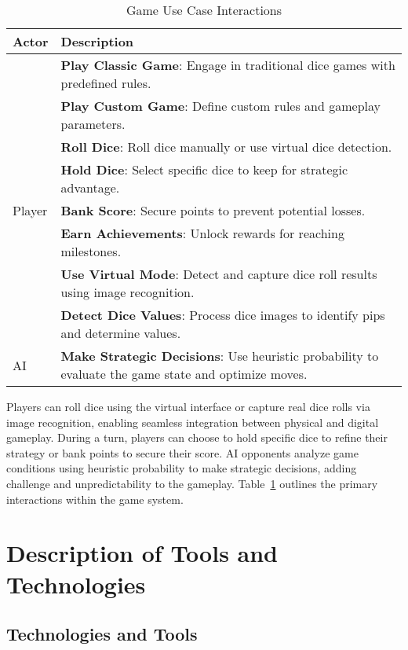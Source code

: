 \begin{table}[ht!]
    \centering
    \begin{tabular}{|l|p{12cm}|}
        \hline
        \textbf{Actor} & \textbf{Description} \\
        \hline
               & \textbf{Play Classic Game}: Engage in traditional dice games with predefined rules. \\
               & \textbf{Play Custom Game}: Define custom rules and gameplay parameters. \\
               & \textbf{Roll Dice}: Roll dice manually or use virtual dice detection. \\
               & \textbf{Hold Dice}: Select specific dice to keep for strategic advantage. \\
        Player & \textbf{Bank Score}: Secure points to prevent potential losses. \\
               & \textbf{Earn Achievements}: Unlock rewards for reaching milestones. \\
               & \textbf{Use Virtual Mode}: Detect and capture dice roll results using image recognition. \\
               & \textbf{Detect Dice Values}: Process dice images to identify pips and determine values. \\
        \hline
        AI & \textbf{Make Strategic Decisions}: Use heuristic probability to evaluate the game state and optimize moves. \\
        \hline
    \end{tabular}    
    \caption{Game Use Case Interactions}
    \label{tab:game_usecase}
\end{table}

Players can roll dice using the virtual interface or capture real dice rolls via image recognition, enabling seamless integration between physical and digital gameplay. During a turn, players can choose to hold specific dice to refine their strategy or bank points to secure their score. AI opponents analyze game conditions using heuristic probability to make strategic decisions, adding challenge and unpredictability to the gameplay. Table~\ref{tab:game_usecase} outlines the primary interactions within the game system.

\section{Description of Tools and Technologies}

\subsection{Technologies and Tools}

